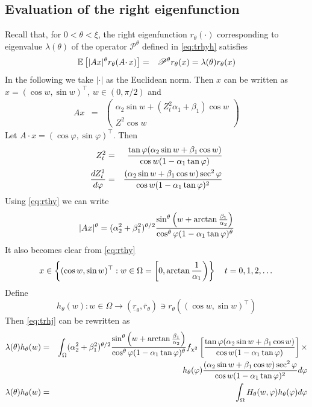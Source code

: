 \subsection{Evaluation of the right eigenfunction}
Recall that, for $0 < \theta < \xi$, the right eigenfunction
$r_\theta(\cdot)$ corresponding to eigenvalue $\lambda(\theta)$ of the
operator $\mathscr P^\theta$ defined in \eqref{eq:trhyh} satisfies
\begin{eqnarray}
  \label{eq:trhj}
  \mathbb{E} \left[
    |A x|^\theta r_\theta(A \cdotp x)
    \right]
  &=&
  \mathscr P^\theta r_\theta(x) = \lambda(\theta) r_\theta(x)
\end{eqnarray}
In the following we take $|\cdot|$ as the Euclidean norm. Then $x$
can be written as $x = (\cos w, \sin w)^\top$, $w \in (0, \pi/2)$ and
\begin{eqnarray*}
  A x &=&
  \begin{pmatrix}
    \alpha_2 \sin w + (Z_t^2 \alpha_1 + \beta_1) \cos w \\
    Z^2 \cos w
  \end{pmatrix}
\end{eqnarray*}
Let $A \cdot x = (\cos \varphi, \sin\varphi)^\top$. Then
\begin{eqnarray}
  Z_t^2 &=&
  {\tan\varphi (\alpha_2 \sin w + \beta_1 \cos w)
    \over
    \cos w (1- \alpha_1 \tan\varphi)
  } \label{eq:rthy} \\
  {d Z_{t}^2 \over d\varphi}
  &=&
  {
    (\alpha_2 \sin w + \beta_1 \cos w) \sec^2\varphi
    \over
    \cos w (1 - \alpha_1 \tan\varphi)^2
  } \nonumber
\end{eqnarray}
Using \eqref{eq:rthy} we can write
\[
|A x|^{\theta}
=
(\alpha_2^2 + \beta_1^2)^{\theta/2}
{
  \sin^\theta\left(
  w + \arctan{\beta_1 \over \alpha_2}
  \right)
  \over
  \cos^\theta\varphi (1 - \alpha_1 \tan\varphi)^\theta
}
\]
It also becomes clear from \eqref{eq:rthy}
\[
x \in \left\{(\cos w, \sin w)^\top:
w \in \Omega = \left[0, \arctan{1 \over \alpha_1}\right)
\right\}
\quad
t = 0,1,2,\dots
\]
Define
\[
h_\theta(w): w \in \Omega \to (\underline r_\theta, \bar r_\theta)
\ni r_\theta((\cos w, \sin w)^\top)
\]
Then \eqref{eq:trhj} can be rewritten as
\begin{eqnarray}
  \lambda(\theta) h_\theta(w)
  &=&
\int_\Omega (\alpha_2^2 + \beta_1^2)^{\theta/2} {
  \sin^\theta\left(
  w + \arctan{\beta_1 \over \alpha_2}
  \right)
  \over
  \cos^\theta\varphi (1 - \alpha_1 \tan\varphi)^\theta
}
f_{\chi^2}\left[
{\tan\varphi (\alpha_2 \sin w + \beta_1 \cos w)
  \over
  \cos w (1- \alpha_1 \tan\varphi)
} \right] \times \nonumber\\
&&
h_\theta(\varphi)
{
  (\alpha_2 \sin w + \beta_1 \cos w) \sec^2\varphi
  \over
  \cos w (1 - \alpha_1 \tan\varphi)^2
}
d\varphi \nonumber \\
\lambda(\theta) h_\theta(w)
&=&
\int_\Omega H_\theta(w, \varphi) h_\theta(\varphi) d\varphi
\end{eqnarray}
